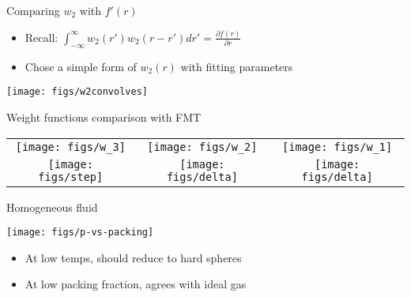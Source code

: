 \documentclass{beamer}
\begin{document}
\begin{frame}{Comparing $w_2$ with $f'(r)$}
  \begin{itemize}
    \item Recall: $\int_{-\infty}^{\infty}w_2(r')w_2(r - r') dr' = \frac{\partial f(r)}{\partial r}$
    \item Chose a simple form of $w_2(r)$ with fitting parameters
  \end{itemize}
  \begin{center}
    \texttt{[image: figs/w2convolves]}  \end{center}
\end{frame}

\begin{frame}{Weight functions comparison with FMT}
  \begin{center}
  \begin{tabular}{ccc}
  \texttt{[image: figs/w\_3]} \hspace{-1.5em} &
  \texttt{[image: figs/w\_2]} \hspace{-1.5em} &
  \texttt{[image: figs/w\_1]} \\
  \texttt{[image: figs/step]} \hspace{-1.5em} &
  \texttt{[image: figs/delta]} \hspace{-1.5em} &
  \texttt{[image: figs/delta]}  
  \end{tabular}
  \end{center}
\end{frame}

\begin{frame}{Homogeneous fluid}
  \begin{center}
    \texttt{[image: figs/p-vs-packing]}
  \end{center}
  \begin{itemize}
    \item At low temps, should reduce to hard spheres
    \item At low packing fraction, agrees with ideal gas
  \end{itemize}
\end{frame}
\end{document}

